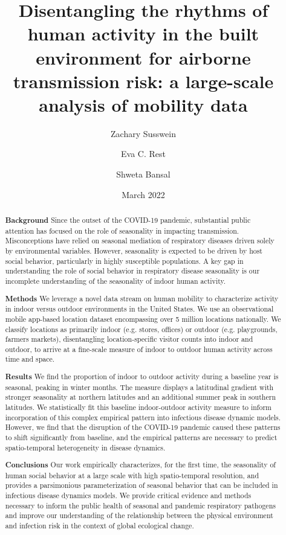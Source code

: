 \documentclass{article}
\title{Disentangling the rhythms of human activity in the built environment for airborne transmission risk: a large-scale analysis of mobility data}
\author[1,]{Zachary Susswein}
\author[1]{Eva C. Rest}
\author[1,*]{Shweta Bansal}
\affil[1]{Department of Biology, Georgetown University, Washington, DC, USA}
\affil[*]{Corresponding Author: shweta.bansal@georgetown.edu}
\date{March 2022}
\begin{document}
\maketitle

\begin{abstract} %

\noindent \textbf{Background} Since the outset of the COVID-19 pandemic, substantial public attention has focused on the role of seasonality in impacting transmission. Misconceptions have relied on seasonal mediation of respiratory diseases driven solely by environmental variables. However, seasonality is expected to be driven by host social behavior, particularly in highly susceptible populations. A key gap in understanding the role of social behavior in respiratory disease seasonality is our incomplete understanding of the seasonality of indoor human activity.

\vspace{0.05in}
\noindent \textbf{Methods} We leverage a novel data stream on human mobility to characterize activity in indoor versus outdoor environments in the United States. We use an observational mobile app-based location dataset encompassing over 5 million locations nationally. We classify locations as primarily indoor (e.g. stores, offices) or outdoor (e.g. playgrounds, farmers markets), disentangling location-specific visitor counts into indoor and outdoor, to arrive at a fine-scale measure of indoor to outdoor human activity across time and space.

\vspace{0.05in}
\noindent \textbf{Results} We find the proportion of indoor to outdoor activity during a baseline year is seasonal, peaking in winter months. The measure displays a latitudinal gradient with stronger seasonality at northern latitudes and an additional summer peak in southern latitudes. We statistically fit this baseline indoor-outdoor activity measure to inform incorporation of this complex empirical pattern into infectious disease dynamic models. However, we find that the disruption of the COVID-19 pandemic caused these patterns to shift significantly from baseline, and the empirical patterns are necessary to predict spatio-temporal heterogeneity in disease dynamics.

\vspace{0.05in}
\noindent \textbf{Conclusions} Our work empirically characterizes, for the first time, the seasonality of human social behavior at a large scale with high spatio-temporal resolution, and provides a parsimonious parameterization of seasonal behavior that can be included in infectious disease dynamics models. We provide critical evidence and methods necessary to inform the public health of seasonal and pandemic respiratory pathogens and improve our understanding of the relationship between the physical environment and infection risk in the context of global ecological change.


\end{abstract}
\end{document}
